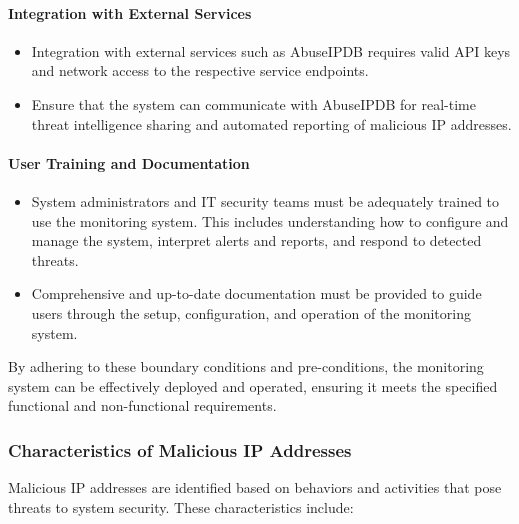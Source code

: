 \documentclass{article}
\begin{document}
    \paragraph{Integration with External Services}
    \begin{itemize}
        \item Integration with external services such as AbuseIPDB requires valid API keys and network access to the respective service endpoints.
        \item Ensure that the system can communicate with AbuseIPDB for real-time threat intelligence sharing and automated reporting of malicious IP addresses.
    \end{itemize}

    \paragraph{User Training and Documentation}
    \begin{itemize}
        \item System administrators and IT security teams must be adequately trained to use the monitoring system.
        This includes understanding how to configure and manage the system, interpret alerts and reports, and respond to detected threats.
        \item Comprehensive and up-to-date documentation must be provided to guide users through the setup, configuration, and operation of the monitoring system.
    \end{itemize}

    \noindent By adhering to these boundary conditions and pre-conditions, the monitoring system can be effectively deployed and operated, ensuring it meets the specified functional and non-functional requirements.

    \subsubsection{Characteristics of Malicious IP Addresses}\label{subsubsec:malicious-ip-characteristics}

    Malicious IP addresses are identified based on behaviors and activities that pose threats to system security.
    These characteristics include:
\end{document}
